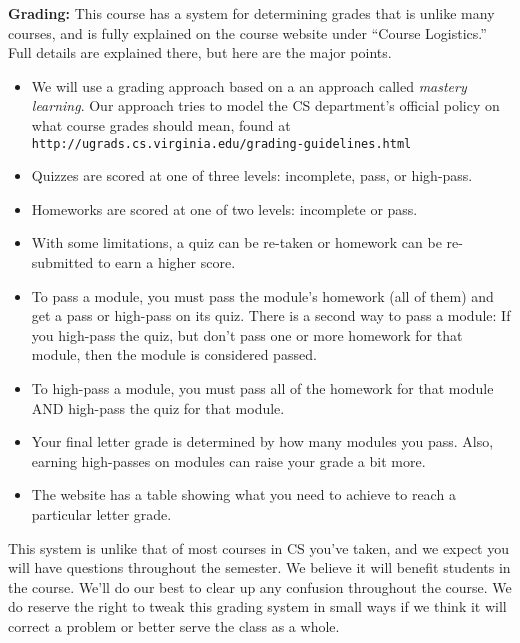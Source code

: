 \documentclass[12pt]{article}
\begin{document}
\textbf{Grading:} This course has a system for determining grades that is unlike many courses, and is fully explained on the course website under ``Course Logistics.'' Full details are explained there, but here are the major points.
\begin{itemize}
    \item We will use a grading approach based on a an approach called {\it mastery learning\/}. Our approach tries to model the CS department's official policy on what course grades should mean, found at {\tt http://ugrads.cs.virginia.edu/grading-guidelines.html}
    \item Quizzes are scored at one of three levels:  incomplete, pass, or high-pass.
    \item Homeworks are scored at one of two levels:  incomplete or pass.
    \item With some limitations, a quiz can be re-taken or homework can be re-submitted to earn a higher score.
    \item To pass a module, you must pass the module's homework (all of them) and get a pass or high-pass on its quiz. There is a second way to pass a module: If you high-pass the quiz, but don't pass one or more homework for that module, then the module is considered passed.
    \item To high-pass a module, you must pass all of the homework for that module AND high-pass the quiz for that module.
    \item Your final letter grade is determined by how many modules you pass. Also, earning high-passes on modules can raise your grade a bit more.
    \item The website has a table showing what you need to achieve to reach a particular letter grade.
\end{itemize}
This system is unlike that of most courses in CS you've taken, and we expect you will have questions throughout the semester. We believe it will benefit students in the course. We'll do our best to clear up any confusion throughout the course. We do reserve the right to tweak this grading system in small ways if we think it will correct a problem or better serve the class as a whole.
\end{document}
